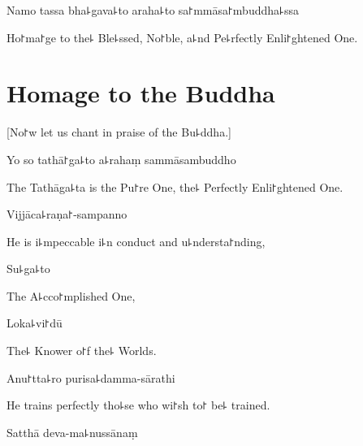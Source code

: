 \vspace{\baselineskip}

%
Namo tassa bha꜕gava꜕to araha꜕to sa꜓mmāsa꜓mbuddha꜕ssa


\begin{english}
  Ho꜓ma꜓ge to the꜕ Ble꜕ssed, No꜓ble, a꜕nd Pe꜕rfectly Enli꜓ghtened One.

\end{english}

\clearpage

\chapter{Homage to the Buddha}                %

\begin{leader}
\end{leader}

\begin{english}
  [No꜓w let us chant in praise of the Bu꜕ddha.]
\end{english}

%
Yo so tathā꜓ga꜕to a꜕rahaṃ sammāsambuddho

\begin{english}
  The Tathāga꜕ta is the Pu꜓re One, the꜕ Perfectly Enli꜓ghtened One.
\end{english}

Vijjāca꜕raṇa꜓-sampanno

\begin{english}
  He is i꜕mpeccable i꜕n conduct and u꜕ndersta꜓nding,
\end{english}

Su꜕ga꜕to

\begin{english}
  The A꜕cco꜓mplished One,
\end{english}

Loka꜕vi꜓dū

\begin{english}
  The꜕ Knower o꜓f the꜕ Worlds.
\end{english}

Anu꜓tta꜕ro purisa꜕damma-sārathi

\begin{english}
  He trains perfectly tho꜕se who wi꜓sh to꜓ be꜕ trained.
\end{english}

Satthā deva-ma꜕nussānaṃ

